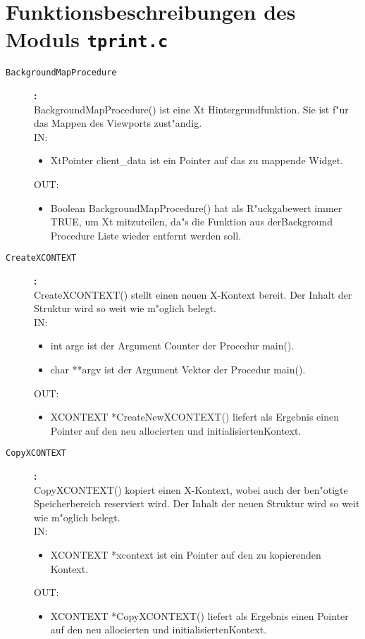\section{Funktionsbeschreibungen des Moduls {\tt tprint.c}}

\begin{description}

\item[\tt BackgroundMapProcedure]{\bf :\\}
BackgroundMapProcedure() ist eine Xt Hintergrundfunktion. Sie ist f"ur das Mappen des Viewports zust"andig. \\
IN:
\begin{itemize}
   \item XtPointer client\_data ist ein Pointer auf das zu mappende Widget.
\end{itemize}
OUT:
\begin{itemize}
   \item Boolean BackgroundMapProcedure() hat als R"uckgabewert immer TRUE, um Xt mitzuteilen, da"s die Funktion aus derBackground Procedure Liste wieder entfernt werden soll.
\end{itemize}

\item[\tt CreateXCONTEXT]{\bf :\\}
CreateXCONTEXT() stellt einen neuen X-Kontext bereit. Der Inhalt der Struktur wird so weit wie m"oglich belegt. \\
IN:
\begin{itemize}
   \item int argc ist der Argument Counter der Procedur main().
   \item char **argv ist der Argument Vektor der Procedur main().
\end{itemize}
OUT:
\begin{itemize}
   \item XCONTEXT *CreateNewXCONTEXT() liefert als Ergebnis einen Pointer auf den neu allocierten und initialisiertenKontext.
\end{itemize}

\item[\tt CopyXCONTEXT]{\bf :\\}
CopyXCONTEXT() kopiert einen X-Kontext, wobei auch der ben"otigte Speicherbereich reserviert wird. Der Inhalt der neuen Struktur wird so weit wie m"oglich belegt. \\
IN:
\begin{itemize}
   \item XCONTEXT *xcontext ist ein Pointer auf den zu kopierenden Kontext.
\end{itemize}
OUT:
\begin{itemize}
   \item XCONTEXT *CopyXCONTEXT() liefert als Ergebnis einen Pointer auf den neu allocierten und initialisiertenKontext.
\end{itemize}


\end{description}
